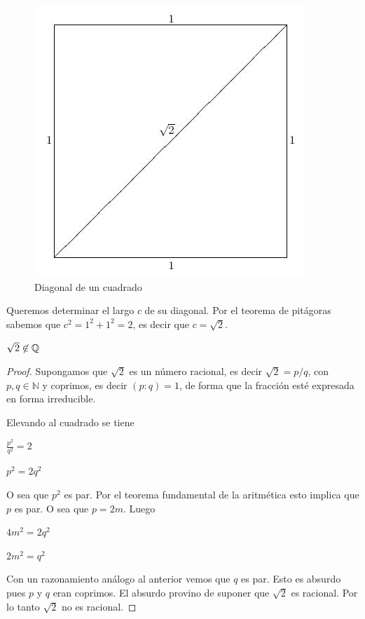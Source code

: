\begin{figure}[h]
\centering\includegraphics[scale=0.5]{images/01_precalculo/unit-square-with-diagonal.jpg}
\caption{Diagonal de un cuadrado}
\end{figure}

Queremos determinar el largo $c$ de su diagonal.  Por el teorema de pitágoras sabemos que $c^2 = 1^2 + 1^2 = 2$, es decir que $c = \sqrt{2}$.  

\begin{theorem}
$\sqrt{2} \not\in \mathbb{Q}$
\end{theorem}

\begin{proof}
Supongamos que $\sqrt{2}$ es un número racional, es decir $\sqrt{2} = p/q$, con $p,q \in \mathbb{N}$ y coprimos, es decir $(p:q) = 1$, de forma que la fracción esté expresada en forma irreducible.

Elevando al cuadrado se tiene

$ \frac{p^2}{q^2} = 2$

$ p^2 = 2 q^2$

O sea que $p^2$ es par.  Por el teorema fundamental de la aritmética esto implica que $p$ es par.  O sea que $p = 2m$.  Luego

$ 4m^2 = 2q^2$

$ 2m^2 = q^2$

Con un razonamiento análogo al anterior vemos que $q$ es par.  Esto es absurdo pues $p$ y $q$ eran coprimos.  El absurdo provino de suponer que $\sqrt{2}$ es racional.  Por lo tanto $\sqrt{2}$ no es racional.
\end{proof}

